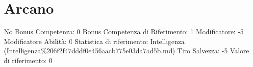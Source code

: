 \section{Arcano}\label{arcano}

\begin{description}
\tightlist
\item[Tags: ABI]
No Bonus Competenza: 0 Bonus Competenza di Riferimento: 1 Modificatore:
-5 Modificatore Abilità: 0 Statistica di riferimento: Intelligenza
(Intelligenza\%206f2f47dddf0e456aacb775e03da7ad5b.md) Tiro Salvezza: -5
Valore di riferimento: 0
\end{description}
